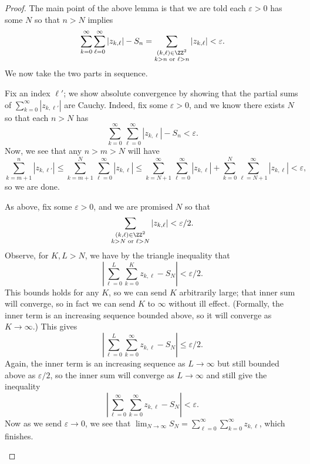 \documentclass[../notes.tex]{subfiles}
\begin{document}
\begin{proof}
	The main point of the above lemma is that we are told each $\varepsilon>0$ has some $N$ so that $n>N$ implies
	\[\sum_{k=0}^\infty\sum_{\ell=0}^\infty|z_{k,\ell}|-S_n=\sum_{\substack{(k,\ell)\in\ZZ^2\\k>n\text{ or }\ell>n}}|z_{k,\ell}|<\varepsilon.\]
	We now take the two parts in sequence.
	\begin{listalph}
		\item Fix an index $\ell'$; we show absolute convergence by showing that the partial sums of $\sum_{k=0}^\infty|z_{k,\ell'}|$ are Cauchy. Indeed, fix some $\varepsilon>0$, and we know there exists $N$ so that each $n>N$ has
		\[\sum_{k=0}^\infty\sum_{\ell=0}^\infty|z_{k,\ell}|-S_n<\varepsilon.\]
		Now, we see that any $n>m>N$ will have
		\[\sum_{k=m+1}^n|z_{k,\ell'}|\le\sum_{k=m+1}^N\sum_{\ell=0}^\infty|z_{k,\ell}|\le\sum_{k=N+1}^\infty\sum_{\ell=0}^\infty|z_{k,\ell}|+\sum_{k=0}^N\sum_{\ell=N+1}^\infty|z_{k,\ell}|<\varepsilon,\]
		so we are done.
		\item As above, fix some $\varepsilon>0$, and we are promised $N$ so that
		\[\sum_{\substack{(k,\ell)\in\ZZ^2\\k>N\text{ or }\ell>N}}|z_{k,\ell}|<\varepsilon/2.\]
		Observe, for $K,L>N$, we have by the triangle inequality that
		\[\left|\sum_{\ell=0}^L\sum_{k=0}^Kz_{k,\ell}-S_N\right|<\varepsilon/2.\]
		This bounds holds for any $K$, so we can send $K$ arbitrarily large; that inner sum will converge, so in fact we can send $K$ to $\infty$ without ill effect. (Formally, the inner term is an increasing sequence bounded above, so it will converge as $K\to\infty$.) This gives
		\[\left|\sum_{\ell=0}^L\sum_{k=0}^\infty z_{k,\ell}-S_N\right|\le\varepsilon/2.\]
		Again, the inner term is an increasing sequence as $L\to\infty$ but still bounded above as $\varepsilon/2$, so the inner sum will converge as $L\to\infty$ and still give the inequality
		\[\left|\sum_{\ell=0}^\infty\sum_{k=0}^\infty z_{k,\ell}-S_N\right|<\varepsilon.\]
		Now as we send $\varepsilon\to0$, we see that $\lim_{N\to\infty}S_N=\sum_{\ell=0}^\infty\sum_{k=0}^\infty z_{k,\ell}$, which finishes.\qedhere
	\end{listalph}
\end{proof}
\end{document}
